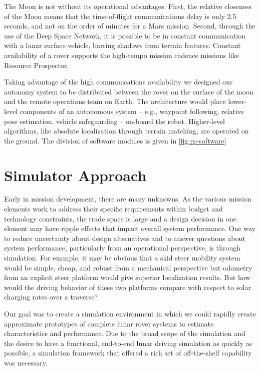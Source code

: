 \documentclass[twocolumn,letterpaper]{IEEEAerospaceCLS}  %
\begin{document}
The Moon is not without its operational advantages.  
First, the relative closeness of the Moon means that the time-of-flight communications delay is only 2.5 seconds, and not on the order of minutes for a Mars mission.  
Second, through the use of the Deep Space Network, it is possible to be in constant communication with a lunar surface vehicle, barring shadows from terrain features.  
Constant availability of a rover supports the high-tempo mission cadence missions like Resource Prospector.


Taking advantage of the high communications availability we designed our autonomy system to be distributed between the rover on the surface of the moon and the remote operations team on Earth.  
The architecture would place lower-level components of an autonomous system -- e.g., waypoint following, relative pose estimation, vehicle safeguarding  -- on-board the robot.  
Higher-level algorithms, like absolute localization through terrain matching, are operated on the ground.  
The division of software modules is given in \cref{fig:rp-software}



\section{Simulator Approach}

Early in mission development, there are many unknowns. 
As the various mission elements work to address their specific requirements within budget and technology constraints, the trade space is large and a design decision in one element may have ripple effects that impact overall system performance. 
One way to reduce uncertainty about design alternatives and to answer questions about system performance, particularly from an operational perspective, is through simulation. 
For example, it may be obvious that a skid steer mobility system would be simple, cheap, and robust from a mechanical perspective but odometry from an explicit steer platform would give superior localization results. 
But how would the driving behavior of these two platforms compare with respect to solar charging rates over a traverse? 

Our goal was to create a simulation environment in which we could rapidly create approximate prototypes of complete lunar rover systems to estimate characteristics and performance. 
Due to the broad scope of the simulation and the desire to have a functional, end-to-end lunar driving simulation as quickly as possible, a simulation framework that offered a rich set of off-the-shelf capability was necessary. 
\end{document}
